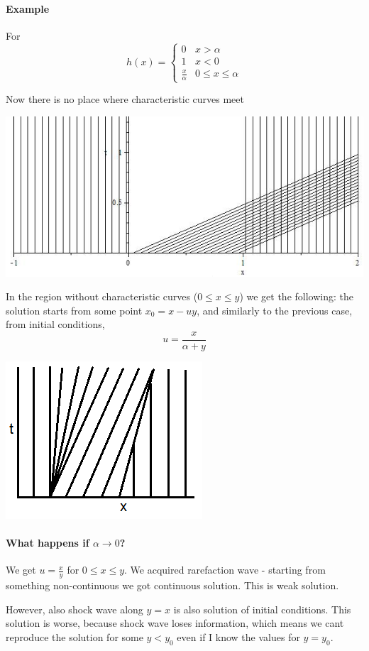 \paragraph{Example}
For
$$h(x) = \begin{cases}
0 & x> \alpha\\
1 & x < 0\\
\frac{x}{\alpha} & 0\leq x \leq \alpha
\end{cases}$$

Now there is no place where characteristic curves meet

\begin{center}
	\includegraphics[width=0.7\linewidth]{./lect2/p3.png}
\end{center}

In the region without characteristic curves ($0\leq x\leq y$) we get the following: the solution starts from some  point $x_0 = x-uy$, and similarly to the previous case, from initial conditions,
$$u=\frac{x}{\alpha +y}$$


\begin{center}
	\includegraphics[width=0.3\linewidth]{./lect2/p4.png}
\end{center}

\paragraph{What happens if $\alpha \to 0$?}
We get $u=\frac{x}{y}$ for $0\leq x \leq y$. We acquired rarefaction wave - starting from something non-continuous we got continuous solution. This is weak solution.

However, also shock wave along $y=x$ is also solution of initial conditions. This solution is worse, because shock wave loses information, which means we cant reproduce the solution for some $y<y_0$ even if I know the values for $y=y_0$.
